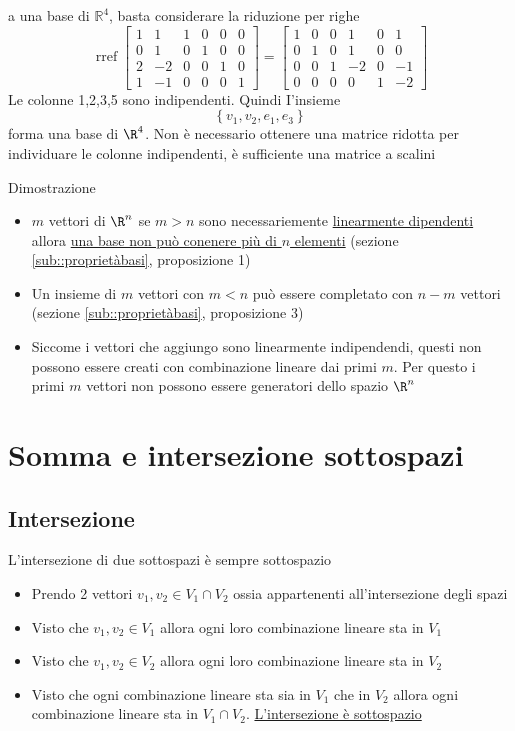 \documentclass[12pt,a4paper,oneside]{article}
\begin{document}
a una base di $\mathbb{R}^4$, basta considerare la riduzione per righe
$$
	\operatorname{rref}\left[\begin{array}{rrrrrr}
			1 & 1  & 1 & 0 & 0 & 0 \\
			0 & 1  & 0 & 1 & 0 & 0 \\
			2 & -2 & 0 & 0 & 1 & 0 \\
			1 & -1 & 0 & 0 & 0 & 1
		\end{array}\right]=\left[\begin{array}{rrrrrr}
			1 & 0 & 0 & 1  & 0 & 1  \\
			0 & 1 & 0 & 1  & 0 & 0  \\
			0 & 0 & 1 & -2 & 0 & -1 \\
			0 & 0 & 0 & 0  & 1 & -2
		\end{array}\right]
$$
Le colonne 1,2,3,5 sono indipendenti. Quindi I'insieme
$$
	\left\{v_1, v_2, e_1, e_3\right\}
$$
forma una base di $\R^{4}$. Non è necessario ottenere una matrice ridotta per individuare le colonne indipendenti, è sufficiente una matrice a scalini

Dimostrazione
\begin{itemize}
	\item  $m$ vettori di $\R ^{n}$ se $m > n$ sono necessariemente \underline{linearmente dipendenti} allora \underline{una base non può conenere più di $n$ elementi} (sezione \ref{sub::proprietàbasi}, proposizione 1)
	\item Un insieme di $m$ vettori con $m<n$ può essere completato con $n-m$ vettori (sezione \ref{sub::proprietàbasi}, proposizione 3)
	\item Siccome i vettori che aggiungo sono linearmente indipendendi, questi non possono essere creati con combinazione lineare dai primi $m$. Per questo i primi  $m$ vettori non possono essere generatori dello spazio $\R^{n}$
\end{itemize}
\section{Somma e intersezione sottospazi}
\subsection{Intersezione}
L'intersezione di due sottospazi è sempre sottospazio
\begin{itemize}
	\item Prendo 2 vettori $ v_1,v_2 \in V_1 \cap V_2$ ossia appartenenti all'intersezione degli spazi
	\item Visto che $ v_1,v_2 \in  V_1 $ allora ogni loro combinazione lineare sta in $ V_1 $
	\item Visto che $ v_1,v_2 \in  V_2 $ allora ogni loro combinazione lineare sta in $ V_2 $
	\item Visto che ogni combinazione lineare sta sia in $ V_1 $ che in $ V_2 $ allora ogni combinazione lineare sta in $ V_1 \cap V_2 $. \underline{L'intersezione è sottospazio}
\end{itemize}
\end{document}
